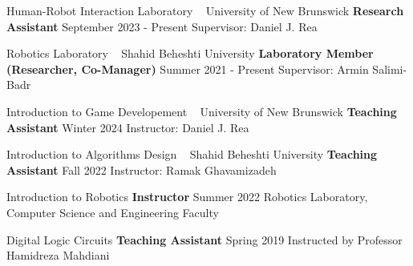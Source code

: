 \begin{cventries}

    \cventry
    {Human-Robot Interaction Laboratory ~ University of New Brunswick}
    {\space \textbf {Research Assistant}}
    {}
    {September 2023 - Present}
    {Supervisor: Daniel J. Rea}
    \vspace{0.4 cm}
\end{cventries}
\begin{cventries}
    \cventry
    {Robotics Laboratory ~ Shahid Beheshti University}
    {\space \textbf {Laboratory Member (Researcher, Co-Manager)}}
    {}
    {Summer 2021 - Present}
    {Supervisor: Armin Salimi-Badr}
    \vspace{0.4 cm}
\end{cventries}
\begin{cventries}
    \cventry
    {Introduction to Game Developement ~ University of New Brunswick}
    {\space \textbf {Teaching Assistant}}
    {}
    {Winter 2024}
    {Instructor: Daniel J. Rea}
    \vspace{0.4 cm}
\end{cventries}
\begin{cventries}
    \cventry
    {Introduction to Algorithms Design ~ Shahid Beheshti University}
    {\space \textbf {Teaching Assistant}}
    {}
    {Fall 2022}
    {Instructor: Ramak Ghavamizadeh}
    \vspace{0.4 cm}
\end{cventries}
\begin{cventries}
    \cventry
    {Introduction to Robotics}
    {\space \textbf {Instructor}}
    {}
    {Summer 2022}
    {Robotics Laboratory, Computer Science and Engineering Faculty}
    \vspace{0.4 cm}
\end{cventries}
\begin{cventries}
    \cventry
    {Digital Logic Circuits}
    {\space \textbf {Teaching Assistant}}
    {}
    {Spring 2019}
    {Instructed by Professor Hamidreza Mahdiani}
    
\end{cventries}